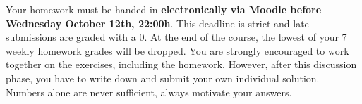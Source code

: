 \documentclass[a4paper,10pt,landscape,twocolumn]{scrartcl}
\newcommand\deadline{Wednesday October 12th, 22:00h}
\begin{document}
\homeworkproblems

{\sffamily\noindent
Your homework must be handed in \textbf{electronically via Moodle before \deadline}.  This deadline is strict and late submissions are graded with a 0. At the end of the course, the lowest of your 7 weekly homework grades will be dropped. You are strongly encouraged to work together on the exercises, including the homework. However, after this discussion phase, you have to write down and submit your own individual solution. Numbers alone are never sufficient, always motivate your answers.
}

\end{document}
